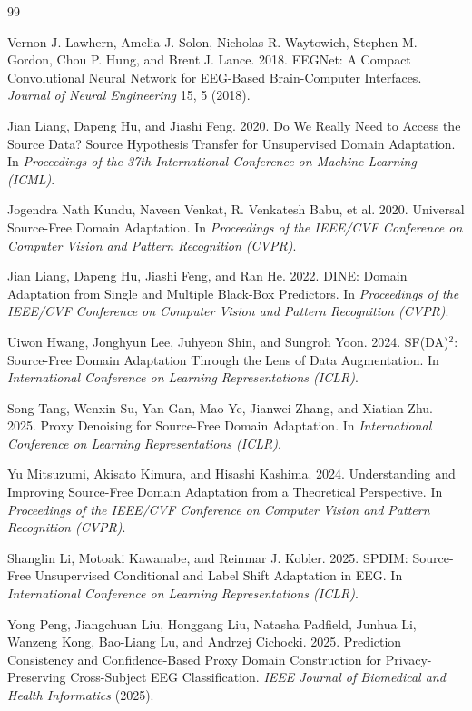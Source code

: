 \documentclass[10pt,twocolumn]{article}
\begin{document}
\begin{thebibliography}{99}

Vernon J. Lawhern, Amelia J. Solon, Nicholas R. Waytowich, Stephen M. Gordon, Chou P. Hung, and Brent J. Lance. 2018. EEGNet: A Compact Convolutional Neural Network for EEG-Based Brain-Computer Interfaces. \emph{Journal of Neural Engineering} 15, 5 (2018).

Jian Liang, Dapeng Hu, and Jiashi Feng. 2020. Do We Really Need to Access the Source Data? Source Hypothesis Transfer for Unsupervised Domain Adaptation. In \emph{Proceedings of the 37th International Conference on Machine Learning (ICML)}.

Jogendra Nath Kundu, Naveen Venkat, R. Venkatesh Babu, et al. 2020. Universal Source-Free Domain Adaptation. In \emph{Proceedings of the IEEE/CVF Conference on Computer Vision and Pattern Recognition (CVPR)}.

Jian Liang, Dapeng Hu, Jiashi Feng, and Ran He. 2022. DINE: Domain Adaptation from Single and Multiple Black-Box Predictors. In \emph{Proceedings of the IEEE/CVF Conference on Computer Vision and Pattern Recognition (CVPR)}.

Uiwon Hwang, Jonghyun Lee, Juhyeon Shin, and Sungroh Yoon. 2024. SF(DA)$^2$: Source-Free Domain Adaptation Through the Lens of Data Augmentation. In \emph{International Conference on Learning Representations (ICLR)}.

Song Tang, Wenxin Su, Yan Gan, Mao Ye, Jianwei Zhang, and Xiatian Zhu. 2025. Proxy Denoising for Source-Free Domain Adaptation. In \emph{International Conference on Learning Representations (ICLR)}.

Yu Mitsuzumi, Akisato Kimura, and Hisashi Kashima. 2024. Understanding and Improving Source-Free Domain Adaptation from a Theoretical Perspective. In \emph{Proceedings of the IEEE/CVF Conference on Computer Vision and Pattern Recognition (CVPR)}.

Shanglin Li, Motoaki Kawanabe, and Reinmar J. Kobler. 2025. SPDIM: Source-Free Unsupervised Conditional and Label Shift Adaptation in EEG. In \emph{International Conference on Learning Representations (ICLR)}.

Yong Peng, Jiangchuan Liu, Honggang Liu, Natasha Padfield, Junhua Li, Wanzeng Kong, Bao-Liang Lu, and Andrzej Cichocki. 2025. Prediction Consistency and Confidence-Based Proxy Domain Construction for Privacy-Preserving Cross-Subject EEG Classification. \emph{IEEE Journal of Biomedical and Health Informatics} (2025).


\end{thebibliography}
\end{document}

